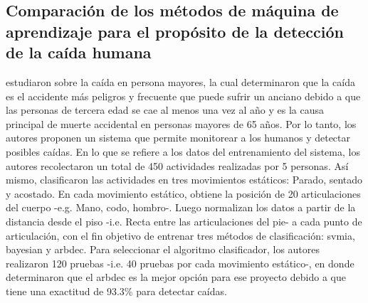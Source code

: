 \subsection{Comparaci\'on de los m\'etodos de m\'aquina de aprendizaje para el prop\'osito de la detecci\'on de la ca\'ida humana} \label{tr:4}
 estudiaron sobre la  ca\'ida en persona mayores, la cual determinaron que la ca\'ida  es el accidente m\'as peligros y frecuente que puede sufrir un anciano debido a que las personas de tercera edad se cae al menos una vez al a\~no y es la causa principal de muerte accidental en personas mayores de 65 a\~nos. Por lo tanto, los autores proponen un sistema que permite monitorear a los humanos y detectar posibles ca\'idas.
\medbreak
En lo que se refiere a los datos del entrenamiento del sistema, los autores recolectaron un total de 450 actividades realizadas por 5 personas. As\'i mismo, clasificaron las actividades en tres movimientos est\'aticos: Parado, sentado y acostado. En cada movimiento est\'atico, obtiene la posici\'on de 20 articulaciones del cuerpo -e.g. Mano, codo, hombro-. Luego normalizan los datos a partir de la distancia desde el piso -i.e. Recta entre las articulaciones del pie- a cada punto de articulaci\'on, con el fin objetivo de entrenar tres m\'etodos de clasificaci\'on: \gls{svmia}, \gls{bayesian} y \gls{arbdec}.
\medbreak
Para seleccionar el algoritmo clasificador, los autores realizaron 120 pruebas -i.e. 40 pruebas por cada movimiento est\'atico-, en donde determinaron  que el \gls{arbdec} es la mejor opci\'on para ese proyecto debido a que tiene una exactitud de 93.3\% para detectar ca\'idas.

